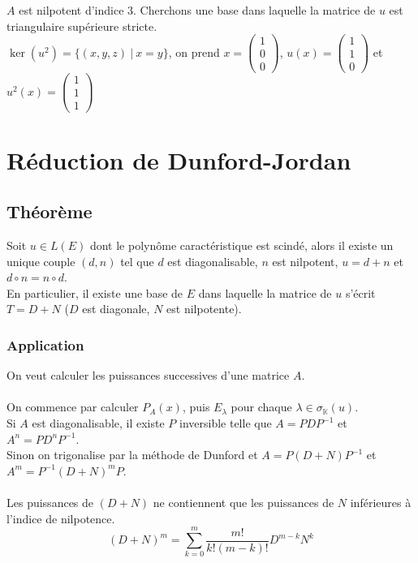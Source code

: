 \documentclass[a4paper,10pt]{book} %
\newcommand{\K}{\mathbb{K}}
\newcommand{\tq}{~|~}
\begin{document}
$A$ est nilpotent d'indice 3. Cherchons une base dans laquelle la matrice de $u$ est triangulaire supérieure stricte.\\

$\ker(u^2)=\{(x,y,z)\tq x=y\}$, on prend $x=\begin{pmatrix}
1\\0\\0
\end{pmatrix}$, $u(x)=\begin{pmatrix}
1\\1\\0
\end{pmatrix}$ et $u^2(x)=\begin{pmatrix}
1\\1\\1
\end{pmatrix}$

\section{Réduction de Dunford-Jordan}
\subsection{Théorème}
Soit $u\in L(E)$ dont le polynôme caractéristique est scindé, alors il existe un unique couple $(d,n)$ tel que $d$ est diagonalisable, $n$ est nilpotent, $u=d+n$ et $d\circ n=n\circ d$.\\

En particulier, il existe une base de $E$ dans laquelle la matrice de $u$ s'écrit $T=D+N$ ($D$ est diagonale, $N$ est nilpotente).

\subsubsection{Application}
On veut calculer les puissances successives d'une matrice $A$.\\\\
On commence par calculer $P_A(x)$, puis $E_\lambda$ pour chaque $\lambda\in \sigma_\K(u)$.\\

Si $A$ est diagonalisable, il existe $P$ inversible telle que $A=PDP^{-1}$ et $A^n=PD^nP^{-1}$.\\
Sinon on trigonalise par la méthode de Dunford et $A=P(D+N)P^{-1}$ et $A^m=P^{-1}(D+N)^mP$.\\\\

Les puissances de $(D+N)$ ne contiennent que les puissances de $N$ inférieures à l'indice de nilpotence.
$$(D+N)^m=\sum_{k=0}^m\frac{m!}{k!(m-k)!}D^{m-k}N^k$$
\end{document}
